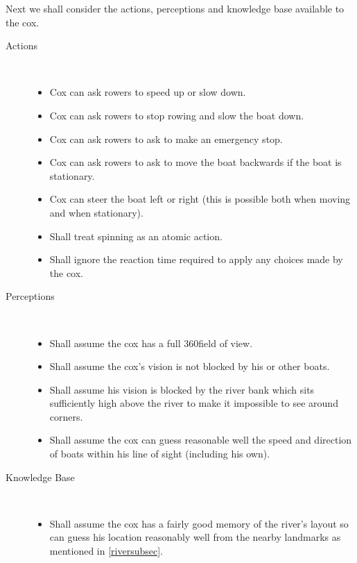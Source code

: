   Next we shall consider the actions, perceptions and knowledge base available to the cox.
  
  \begin{description}
    \item[Actions] \\
      \begin{itemize}
        \item Cox can ask rowers to speed up or slow down.
        \item Cox can ask rowers to stop rowing and slow the boat down.
        \item Cox can ask rowers to ask to make an emergency stop.
        \item Cox can ask rowers to ask to move the boat backwards if the boat is stationary.
        \item Cox can steer the boat left or right (this is possible both when moving and when stationary).
        \item Shall treat spinning as an atomic action.
        \item Shall ignore the reaction time required to apply any choices
          made by the cox.
        \end{itemize}
    \item[Perceptions] \\
      \begin{itemize}
        \item Shall assume the cox has a full 360\textdegree field of
          view.
        \item Shall assume the cox's vision is not blocked by his or other boats.
        \item Shall assume his
        vision is blocked by the river bank which sits sufficiently high
        above the river to make it impossible to see around corners.
        \item Shall assume the cox can guess reasonable well the speed and
        direction of boats within his line of sight (including his own).
        \end{itemize}
    \item[Knowledge Base] \\
      \begin{itemize}
        \item Shall assume the cox has a fairly good memory of the river's
          layout so can guess his location reasonably well from the nearby
          landmarks as mentioned in \ref{riversubsec}.
      \end{itemize}
  \end{description}


